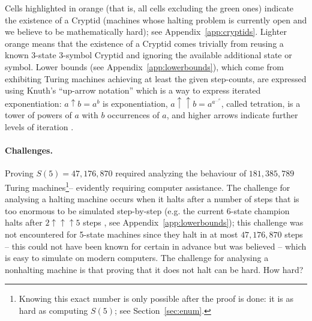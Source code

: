 \documentclass[a4paper,british]{article}
\theoremstyle{definition} %
\numberwithin{equation}{section}
\theoremstyle{definition} %
\newcommand{\BBtheFifth}{47{,}176{,}870}
\newcommand{\BBtheFifthTNF}{181{,}385{,}789}
\begin{document}
\begin{table}[h]
{        Cells highlighted in orange (that is, all cells excluding the green ones) indicate the existence of a Cryptid (\ie machines whose halting problem is currently open and we believe to be mathematically hard); see Appendix~\ref{app:cryptids}. Lighter orange means that the existence of a Cryptid comes trivially from reusing a known 3-state 3-symbol Cryptid and ignoring the available additional state or symbol. Lower bounds (see Appendix~\ref{app:lowerbounds}), which come from exhibiting Turing machines achieving at least the given step-counts, are expressed using Knuth's ``up-arrow notation'' which is a way to express iterated exponentiation:
        $a \uparrow b = a^b$ is exponentiation,
        $a \uparrow\uparrow b = a^{a^{\dots^a}}$, called tetration, is a tower of powers of $a$ with $b$ occurrences of $a$,
        and higher arrows indicate further levels of iteration \cite{Knuth1976Coping}.
    }
    \label{table:landscape}
\end{table}

\vspace{-2ex}
\paragraph{Challenges.} Proving $S(5) = \BBtheFifth$ required analyzing the behaviour of $\BBtheFifthTNF$ Turing machines\footnote{Knowing this exact number is only possible after the proof is done: it is as hard as computing $S(5)$; see Section~\ref{sec:enum}.}-- evidently requiring computer assistance. The challenge for analysing a halting machine occurs when it halts after a number of steps that is too enormous to be simulated step-by-step (e.g. the current 6-state champion halts after $2 \uparrow \uparrow \uparrow 5$ steps \cite{Pavel_discorvery}, see Appendix~\ref{app:lowerbounds}); this challenge was not encountered for 5-state machines since they halt in at most $\BBtheFifth$ steps -- this could not have been known for certain in advance but was believed -- which is easy to simulate on modern computers. The challenge for analysing a nonhalting machine is that proving that it does not halt can be hard. How hard?
\end{document}
